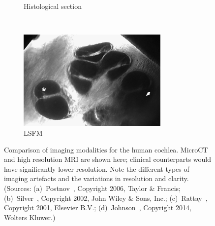 \begin{figure}[p]
\begin{subfigure}[t]{0.49\textwidth}
        \caption{Histological section}
		\label{fig:histo_human}
    \end{subfigure}%
    ~%
    \begin{subfigure}[t]{0.49\textwidth}
        \centering
        \includegraphics[height=4.9cm]{Methodology/tslim_human_johnson}
        \caption{LSFM}
        \label{fig:opfos_human}
    \end{subfigure}%
    
	\caption[Comparison of imaging modalities for the human cochlea]{Comparison of
	imaging modalities for the human cochlea. MicroCT and high resolution MRI are
	shown here; clinical counterparts would have significantly lower resolution.
	Note the different types of imaging artefacts and the variations in
	resolution and clarity. (Sources: (a)~Postnov~\cite{postnov2006}, Copyright
	\textcopyright{} 2006, Taylor \& Francis; (b)~Silver~\cite{silver2002},
	Copyright \textcopyright{} 2002, John Wiley \& Sons, Inc.;
	(c)~Rattay~\cite{rattay2001model}, Copyright \textcopyright{} 2001, Elsevier
	B.V.; (d)~Johnson~\cite{johnson2014}, Copyright	\textcopyright{} 2014,
	Wolters Kluwer.)}
	\label{fig:imaging_comparison_human}
\end{figure}


